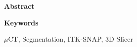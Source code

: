 
\newcommand*{\AbstractHead}[1]{%
{\noindent\color{header-blue}\Large\textbf{#1}}
\vspace{10pt}\\
}%

\newcommand*{\SomeSpace}{%
\vspace{\baselineskip}
}

\AbstractHead{Abstract}
\noindent
\normalsize
\begin{body}
\lipsum[1]
\end{body}
\SomeSpace
\AbstractHead{Keywords}
\label{s:Keywords}
\normalsize
\noindent
\begin{body}
$\mu$CT, Segmentation, ITK-SNAP, 3D Slicer
\end{body}
\glsresetall
\SomeSpace

\SomeSpace
\normalsize

\glsresetall
